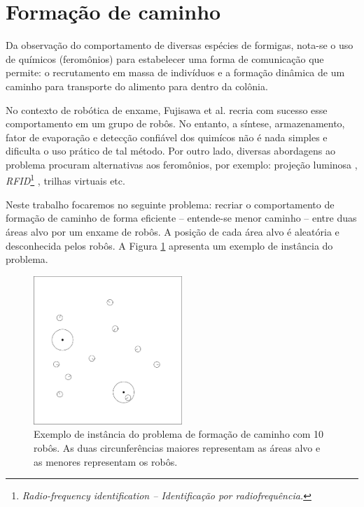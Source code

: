 \section{Formação de caminho}

Da observação do comportamento de diversas espécies de formigas, nota-se o uso de químicos (feromônios) para estabelecer uma forma de comunicação que permite: o recrutamento em massa de indivíduos e a formação dinâmica de um caminho para transporte do alimento para dentro da colônia.

No contexto de robótica de enxame, Fujisawa et al. \cite{fujisawa2008pheromone} recria com sucesso esse comportamento em um grupo de robôs. No entanto, a síntese, armazenamento, fator de evaporação e detecção confiável dos quimícos não é nada simples e dificulta o uso prático de tal método.
Por outro lado, diversas abordagens ao problema procuram alternativas aos feromônios, por exemplo: projeção luminosa \cite{garnier2007alice}, \textit{RFID}\footnote{\textit{Radio-frequency identification -- Identificação por radiofrequência.}} \cite{mamei2007rfid}, trilhas virtuais \cite{payton2001pheromone} etc.

Neste trabalho focaremos no seguinte problema: recriar o comportamento de formação de caminho de forma eficiente -- entende-se menor caminho -- entre duas áreas alvo por um enxame de robôs. A posição de cada área alvo é aleatória e desconhecida pelos robôs. A Figura \ref{fig:path-formation} apresenta um exemplo de instância do problema.

\begin{figure}[H]
    \centering
    \includegraphics[width=0.5\textwidth]{figures/path-formation}

    \caption{Exemplo de instância do problema de formação de caminho com 10 robôs. As duas circunferências maiores representam as áreas alvo e as menores representam os robôs.}
    \label{fig:path-formation}
\end{figure}